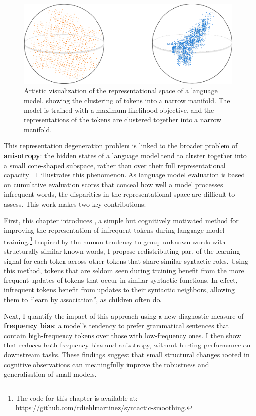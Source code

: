 \begin{figure}[ht!]
    \centering
    \includegraphics[width=0.8\linewidth]{chapters/syntatic-smoothing/figures/anisotropy_visualization.pdf}
    \caption{Artistic visualization of the representational space of a language model, showing the clustering of tokens into a narrow manifold. The model is trained with a maximum likelihood objective, and the representations of the tokens are clustered together into a narrow manifold.}
    \label{fig:anisotropy_visualization}
\end{figure}

\newpage

This representation degeneration problem is linked to the broader problem of \textbf{anisotropy}: the hidden states of a language model tend to cluster together into a small cone-shaped subspace, rather than over their full representational capacity \citep{arora2016latent, ethayarajh2019contextual, gao2018representation}. \cref{fig:anisotropy_visualization} illustrates this phenomenon. As language model evaluation is based on cumulative evaluation scores that conceal how well a model processes infrequent words, the disparities in the representational space are difficult to assess. This work makes two key contributions:

First, this chapter introduces \smoothing, a simple but cognitively motivated method for improving the representation of infrequent tokens during language model training.\footnote{The code for this chapter is available at: https://github.com/rdiehlmartinez/syntactic-smoothing.} Inspired by the human tendency to group unknown words with structurally similar known words, I propose redistributing part of the learning signal for each token across other tokens that share similar syntactic roles. Using this method, tokens that are seldom seen during training benefit from the more frequent updates of tokens that occur in similar syntactic functions.  In effect, infrequent tokens benefit from updates to their syntactic neighbors, allowing them to ``learn by association'', as children often do.

Next, I quantify the impact of this approach using a new diagnostic measure of \textbf{frequency bias}: a model's tendency to prefer grammatical sentences that contain high-frequency tokens over those with low-frequency ones. I then show that \smoothing reduces both frequency bias and anisotropy, without hurting performance on downstream tasks. These findings suggest that small structural changes rooted in cognitive observations can meaningfully improve the robustness and generalisation of small models.

